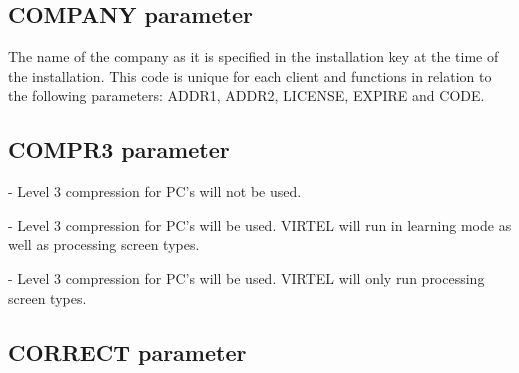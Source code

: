 \documentclass[letterpaper,10pt,english]{sphinxmanual}
\begin{document}
\subsection{COMPANY parameter}
\label{\detokenize{Installation_Guide:index-44}}\label{\detokenize{Installation_Guide:company-parameter}}
\begin{sphinxVerbatim}[commandchars=\\\{\}]
 
\end{sphinxVerbatim}

The name of the company as it is specified in the installation key at the time of the installation. This code is unique for
each client and functions in relation to the following parameters: ADDR1, ADDR2, LICENSE, EXPIRE and CODE.


\subsection{COMPR3 parameter}
\label{\detokenize{Installation_Guide:index-45}}\label{\detokenize{Installation_Guide:compr3-parameter}}
\begin{sphinxVerbatim}[commandchars=\\\{\}]
 
\end{sphinxVerbatim}

 - Level 3 compression for PC’s will not be used.

 - Level 3 compression for PC’s will be used. VIRTEL will run in learning mode as well as processing screen types.

 - Level 3 compression for PC’s will be used. VIRTEL will only run processing screen types.


\subsection{CORRECT parameter}
\label{\detokenize{Installation_Guide:index-46}}\label{\detokenize{Installation_Guide:correct-parameter}}
\begin{sphinxVerbatim}[commandchars=\\\{\}]
  
\end{sphinxVerbatim}
\end{document}
